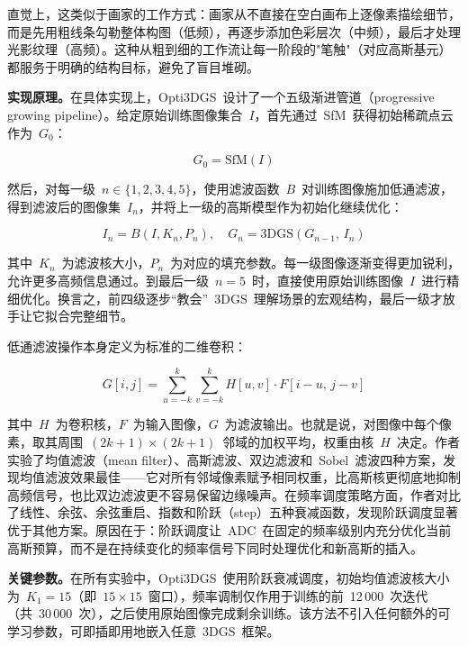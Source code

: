 直觉上，这类似于画家的工作方式：画家从不直接在空白画布上逐像素描绘细节，而是先用粗线条勾勒整体构图（低频），再逐步添加色彩层次（中频），最后才处理光影纹理（高频）。这种从粗到细的工作流让每一阶段的"笔触"（对应高斯基元）都服务于明确的结构目标，避免了盲目堆砌。

\textbf{实现原理。}在具体实现上，Opti3DGS~设计了一个五级渐进管道（progressive growing pipeline）。给定原始训练图像集合~$I$，首先通过~SfM~获得初始稀疏点云作为~$G_0$：

\begin{equation}
    G_0 = \mathrm{SfM}(I)
\end{equation}

然后，对每一级~$n \in \{1, 2, 3, 4, 5\}$，使用滤波函数~$B$~对训练图像施加低通滤波，得到滤波后的图像集~$I_n$，并将上一级的高斯模型作为初始化继续优化：

\begin{equation}
    I_n = B(I, K_n, P_n), \quad G_n = \mathrm{3DGS}(G_{n-1},\, I_n)
\end{equation}

其中~$K_n$~为滤波核大小，$P_n$~为对应的填充参数。每一级图像逐渐变得更加锐利，允许更多高频信息通过。到最后一级~$n{=}5$~时，直接使用原始训练图像~$I$~进行精细优化。换言之，前四级逐步``教会''~3DGS~理解场景的宏观结构，最后一级才放手让它拟合完整细节。

低通滤波操作本身定义为标准的二维卷积：

\begin{equation}
    G[i,j] = \sum_{u=-k}^{k} \sum_{v=-k}^{k} H[u,v] \cdot F[i{-}u,\, j{-}v]
\end{equation}

其中~$H$~为卷积核，$F$~为输入图像，$G$~为滤波输出。也就是说，对图像中每个像素，取其周围~$(2k{+}1) \times (2k{+}1)$~邻域的加权平均，权重由核~$H$~决定。作者实验了均值滤波（mean filter）、高斯滤波、双边滤波和~Sobel~滤波四种方案，发现均值滤波效果最佳——它对所有邻域像素赋予相同权重，比高斯核更彻底地抑制高频信号，也比双边滤波更不容易保留边缘噪声。在频率调度策略方面，作者对比了线性、余弦、余弦重启、指数和阶跃（step）五种衰减函数，发现阶跃调度显著优于其他方案。原因在于：阶跃调度让~ADC~在固定的频率级别内充分优化当前高斯预算，而不是在持续变化的频率信号下同时处理优化和新高斯的插入。

\textbf{关键参数。}在所有实验中，Opti3DGS~使用阶跃衰减调度，初始均值滤波核大小为~$K_1{=}15$（即~$15 \times 15$~窗口），频率调制仅作用于训练的前~12\,000~次迭代（共~30\,000~次），之后使用原始图像完成剩余训练。该方法不引入任何额外的可学习参数，可即插即用地嵌入任意~3DGS~框架。

